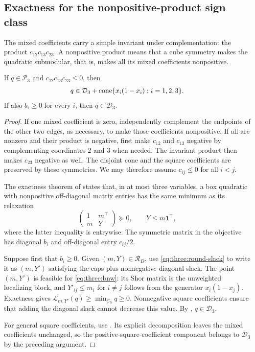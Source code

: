 \subsection{Exactness for the nonpositive-product sign class}

The mixed coefficients carry a simple invariant under complementation:
the product $c_{12}c_{13}c_{23}$. A nonpositive product means that a cube
symmetry makes the quadratic submodular, that is, makes all its mixed
coefficients nonpositive.

\begin{theorem}\label{three:sign}
If $q\in\mathcal P_3$ and $c_{12}c_{13}c_{23}\le0$, then
\[
 q\in \mathcal D_3+\operatorname{cone}\{x_i(1-x_i):i=1,2,3\}.
\]
If also $b_i\ge0$ for every $i$, then $q\in \mathcal D_3$.
\end{theorem}
\begin{proof}
If one mixed coefficient is zero, independently complement the endpoints
of the other two edges, as necessary, to make those coefficients
nonpositive. If all are nonzero and their product is negative, first make
$c_{12}$ and $c_{13}$ negative by complementing coordinates $2$ and $3$
when needed. The invariant product then makes $c_{23}$ negative as well.
The disjoint cone and the square coefficients are preserved by these
symmetries. We may therefore assume $c_{ij}\le0$ for all $i<j$.

The exactness theorem of \citet[Theorem~1]{BurerNatarajanWillemsen2025}
states that, in at most three variables, a box quadratic with nonpositive
off-diagonal matrix entries has the same minimum as its relaxation
\begin{equation}\label{eq:three:bnw}
 \begin{pmatrix}1&m^\top\\m&Y\end{pmatrix}\succeq0,
 \qquad Y\le m\mathbf1^\top,
\end{equation}
where the latter inequality is entrywise. The symmetric matrix in the
objective has diagonal $b_i$ and off-diagonal entry $c_{ij}/2$.

Suppose first that $b_i\ge0$. Given $(m,Y)\in \mathcal R_D$, use
\eqref{eq:three:round-slack} to write it as $(m,Y')$ satisfying the caps
plus nonnegative diagonal slack. The point $(m,Y')$ is feasible for
\eqref{eq:three:bnw}: its Shor matrix is the unweighted localizing block,
and $Y'_{ij}\le m_i$ for $i\ne j$ follows from the generator
$x_i(1-x_j)$. Exactness gives $\mathcal L_{m,Y'}(q)\ge\min_{C_3}q\ge0$.
Nonnegative square coefficients ensure that adding the diagonal slack
cannot decrease this value. By , $q\in \mathcal D_3$.

For general square coefficients, use . Its explicit
decomposition leaves the mixed coefficients unchanged, so the
positive-square-coefficient component belongs to $\mathcal D_3$ by the preceding
argument.
\end{proof}

